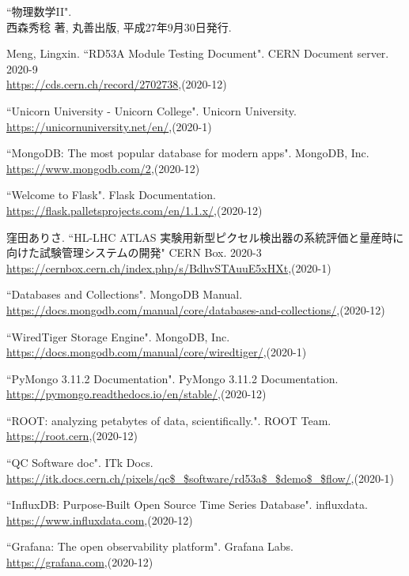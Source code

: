 \begin{thebibliography}{9}
``物理数学II".\\
西森秀稔 著, 丸善出版, 平成27年9月30日発行.

Meng, Lingxin. ``RD53A Module Testing Document". CERN Document server. 2020-9\\
\url{https://cds.cern.ch/record/2702738},(2020-12)

``Unicorn University - Unicorn College". Unicorn University.\\
\url{https://unicornuniversity.net/en/},(2020-1)

``MongoDB: The most popular database for modern apps". MongoDB, Inc. \\
\url{https://www.mongodb.com/2},(2020-12)

``Welcome to Flask". Flask Documentation. \\
\url{https://flask.palletsprojects.com/en/1.1.x/},(2020-12)

窪田ありさ. ``HL-LHC ATLAS 実験用新型ピクセル検出器の系統評価と量産時に向けた試験管理システムの開発" CERN Box. 2020-3\\
\url{https://cernbox.cern.ch/index.php/s/BdhvSTAuuE5xHXt},(2020-1)

``Databases and Collections". MongoDB Manual. \\
\url{https://docs.mongodb.com/manual/core/databases-and-collections/},(2020-12)

``WiredTiger Storage Engine". MongoDB, Inc. \\
\url{https://docs.mongodb.com/manual/core/wiredtiger/},(2020-1)

``PyMongo 3.11.2 Documentation". PyMongo 3.11.2 Documentation.\\
\url{https://pymongo.readthedocs.io/en/stable/},(2020-12)

``ROOT: analyzing petabytes of data, scientifically.". ROOT Team.\\ 
\url{https://root.cern},(2020-12)

``QC Software doc". ITk Docs. \\
\url{https://itk.docs.cern.ch/pixels/qc$\_$software/rd53a$\_$demo$\_$flow/},(2020-1)

``InfluxDB: Purpose-Built Open Source Time Series Database". influxdata. \\
\url{https://www.influxdata.com},(2020-12)

``Grafana: The open observability platform". Grafana Labs. \\
\url{https://grafana.com},(2020-12)


\end{thebibliography}
